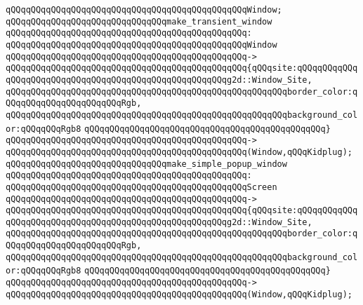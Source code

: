 \verb|qQQqqQQqqQQqqQQqqQQqqQQqqQQqqQQqqQQqqQQqqQQqqQQqWindow;|\newline
\newline
\verb|qQQqqQQqqQQqqQQqqQQqqQQqqQQqqQQqmake_transient_window|\newline
\verb|qQQqqQQqqQQqqQQqqQQqqQQqqQQqqQQqqQQqqQQqqQQqqQQq:|\newline
\verb|qQQqqQQqqQQqqQQqqQQqqQQqqQQqqQQqqQQqqQQqqQQqqQQqWindow|\newline
\verb|qQQqqQQqqQQqqQQqqQQqqQQqqQQqqQQqqQQqqQQqqQQqqQQq->|\newline
\verb|qQQqqQQqqQQqqQQqqQQqqQQqqQQqqQQqqQQqqQQqqQQqqQQq{qQQqsite:qQQqqQQqqQQqqQQqqQQqqQQqqQQqqQQqqQQqqQQqqQQqqQQqqQQqqQQqg2d::Window_Site,|\newline
\verb|qQQqqQQqqQQqqQQqqQQqqQQqqQQqqQQqqQQqqQQqqQQqqQQqqQQqqQQqborder_color:qQQqqQQqqQQqqQQqqQQqqQQqRgb,|\newline
\verb|qQQqqQQqqQQqqQQqqQQqqQQqqQQqqQQqqQQqqQQqqQQqqQQqqQQqqQQqbackground_color:qQQqqQQqRgb8|\newline
\verb|qQQqqQQqqQQqqQQqqQQqqQQqqQQqqQQqqQQqqQQqqQQqqQQq}|\newline
\verb|qQQqqQQqqQQqqQQqqQQqqQQqqQQqqQQqqQQqqQQqqQQqqQQq->|\newline
\verb|qQQqqQQqqQQqqQQqqQQqqQQqqQQqqQQqqQQqqQQqqQQqqQQq(Window,qQQqKidplug);|\newline
\newline
\verb|qQQqqQQqqQQqqQQqqQQqqQQqqQQqqQQqmake_simple_popup_window|\newline
\verb|qQQqqQQqqQQqqQQqqQQqqQQqqQQqqQQqqQQqqQQqqQQqqQQq:|\newline
\verb|qQQqqQQqqQQqqQQqqQQqqQQqqQQqqQQqqQQqqQQqqQQqqQQqScreen|\newline
\verb|qQQqqQQqqQQqqQQqqQQqqQQqqQQqqQQqqQQqqQQqqQQqqQQq->|\newline
\verb|qQQqqQQqqQQqqQQqqQQqqQQqqQQqqQQqqQQqqQQqqQQqqQQq{qQQqsite:qQQqqQQqqQQqqQQqqQQqqQQqqQQqqQQqqQQqqQQqqQQqqQQqqQQqqQQqg2d::Window_Site,|\newline
\verb|qQQqqQQqqQQqqQQqqQQqqQQqqQQqqQQqqQQqqQQqqQQqqQQqqQQqqQQqborder_color:qQQqqQQqqQQqqQQqqQQqqQQqRgb,|\newline
\verb|qQQqqQQqqQQqqQQqqQQqqQQqqQQqqQQqqQQqqQQqqQQqqQQqqQQqqQQqbackground_color:qQQqqQQqRgb8|\newline
\verb|qQQqqQQqqQQqqQQqqQQqqQQqqQQqqQQqqQQqqQQqqQQqqQQq}|\newline
\verb|qQQqqQQqqQQqqQQqqQQqqQQqqQQqqQQqqQQqqQQqqQQqqQQq->|\newline
\verb|qQQqqQQqqQQqqQQqqQQqqQQqqQQqqQQqqQQqqQQqqQQqqQQq(Window,qQQqKidplug);|\newline
